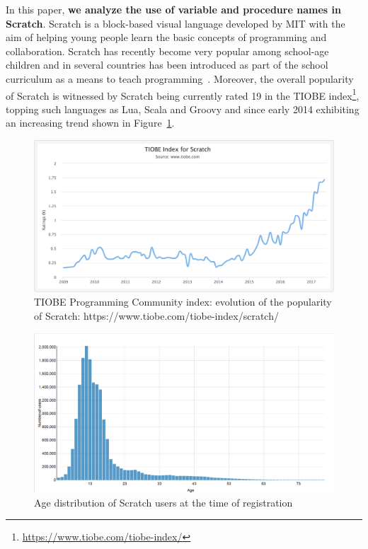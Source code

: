 \documentclass[conference]{IEEEtran}
\begin{document}

In this paper, \textbf{we analyze the use of variable and procedure names in Scratch}. 
Scratch is a block-based visual language developed by MIT with the aim of helping young people learn the basic concepts of programming and collaboration. 
Scratch has recently become very popular among school-age children and in several countries has been introduced as part of the school curriculum as a means to teach programming~\cite{vanZyl,SaezLopez}.
Moreover, the overall popularity of Scratch is witnessed by Scratch being currently rated 19 in the TIOBE index\footnote{\url{https://www.tiobe.com/tiobe-index/}}, topping such languages as Lua, Scala and Groovy and since early 2014 exhibiting an increasing trend shown in Figure~\ref{fig:tiobe}.
\begin{figure}
  \begin{center}
  \includegraphics[width=\columnwidth]{fig/tiobe}
  \caption{TIOBE Programming Community index: evolution of the popularity of Scratch: https://www.tiobe.com/tiobe-index/scratch/}
  \label{fig:tiobe}
  \end{center}
\end{figure} 

\begin{figure}[tb]
	\begin{center}
		\includegraphics[width=\columnwidth]{fig/scratch_users}
		\caption{Age distribution of Scratch users at the time of registration}
		\label{fig:scratch_users}
	\end{center}
\end{figure} 
\end{document}
